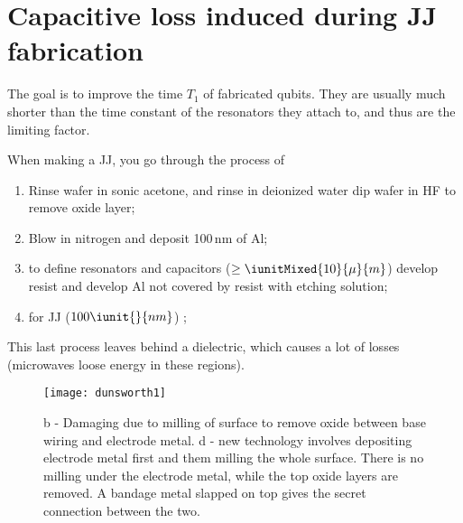 
\section{Capacitive loss induced during JJ fabrication}
\label{sec:capac-loss-induc}

\begin{framed}\noindent
  The goal  is to  improve the time  $ T_{1} $  of fabricated  qubits.  They are  usually much
  shorter than the time  constant of the resonators they attach to, and  thus are the limiting
  factor.

  When making a JJ, you go through the process of
  \begin{enumerate}
  \item Rinse  wafer in sonic acetone,  and rinse in deionized  water \ira dip wafer  in HF to
    remove oxide layer;
  \item Blow in nitrogen and deposit 100\,nm of Al;
  \item     {}     to    define     resonators    and     capacitors
    ($ \ge \iunitMixed{10}{\mu}{m} $) \ra develop resist and develop Al not covered by resist with
    etching solution;
  \item  {}  for  JJ  ($  100  \iunit{}{nm}  $)  \ira  {};
  \end{enumerate}

  \noindent  This last  process leaves  behind  a dielectric,  which  causes a  lot of  losses
  (microwaves  loose energy  in  these regions).   
\end{framed}

\begin{figure}[h]
  \centering \texttt{[image: dunsworth1]}
  \caption{\small b - Damaging  due to milling of surface to remove  oxide between base wiring
    and electrode metal. d - new technology involves depositing electrode metal first and them
    milling the whole  surface. There is no  milling under the electrode metal,  while the top
    oxide layers  are removed.  A bandage  metal slapped  on top  gives the  secret connection
    between the two.}
  \label{fig:dunsworth1.png}
\end{figure}

